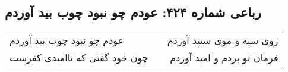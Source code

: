 \begin{center}
\section*{رباعی شماره ۴۲۴: عودم چو نبود چوب بید آوردم}
\label{sec:sh424}
\begin{longtable}{l p{0.5cm} r}
عودم چو نبود چوب بید آوردم
&&
روی سیه و موی سپید آوردم
\\
چون خود گفتی که ناامیدی کفرست
&&
فرمان تو بردم و امید آوردم
\\
\end{longtable}
\end{center}

